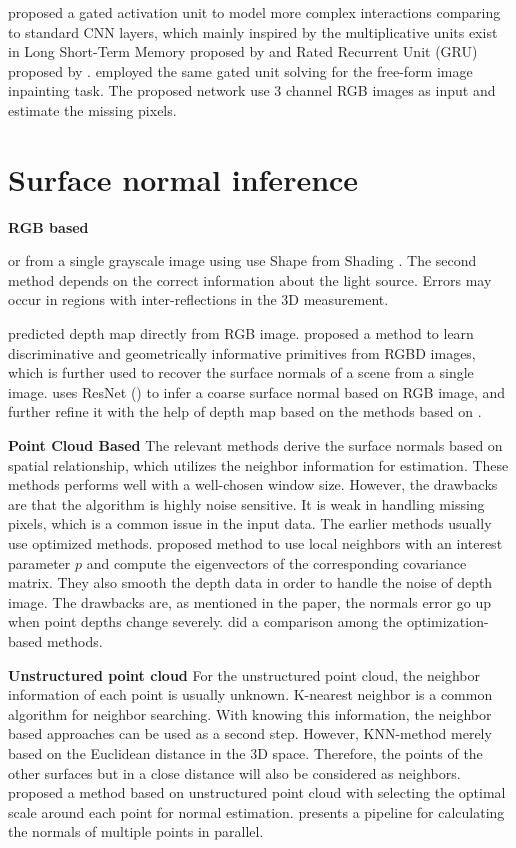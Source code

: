 \cite{gated_activation} proposed a gated activation unit to model more complex interactions comparing to standard CNN layers, which mainly inspired by the multiplicative units exist in Long Short-Term Memory proposed by \cite{lstm} and Rated Recurrent Unit (GRU) proposed by \cite{gru}. 
\cite{gconv} employed the same gated unit solving for the free-form image inpainting task. The proposed network use 3 channel RGB images as input and estimate the missing pixels. 




\section{Surface normal inference}
\textbf{RGB based}  

or from a single grayscale image using use Shape from Shading \cite{SFS}.  The second method depends on the correct information about the light source. Errors may occur in regions with inter-reflections in the 3D measurement. 


\cite{Eigen} predicted depth map directly from RGB image. 
\cite{geometry_based_solution} proposed a method to learn discriminative and geometrically informative primitives from RGBD images, which is further used to recover the surface normals of a scene from a single image. 
\cite{GeoNet} uses ResNet (\cite{resnet}) to infer a coarse surface normal based on RGB image, and further refine it with the help of depth map based on the methods based on \cite{geometry_based_solution}.


\textbf{Point Cloud Based} 
The relevant methods derive the surface normals based on spatial relationship, which utilizes the neighbor information for estimation. These methods performs well with a well-chosen window size. However, the drawbacks are that the algorithm is highly noise sensitive. It is weak in handling missing pixels, which is a common issue in the input data. The earlier methods usually use optimized methods. \cite{Holzer.S} proposed method to use local neighbors with an interest parameter $ p $ and compute the eigenvectors of the corresponding covariance matrix. They also smooth the depth data in order to handle the noise of depth image. The drawbacks are, as mentioned in the paper, the normals error go up when point depths change severely.  \cite{optimized-methods} did a comparison among the optimization-based methods. 

\textbf{Unstructured point cloud}
For the unstructured point cloud, the neighbor information of each point is usually unknown. K-nearest neighbor is a common algorithm for neighbor searching. With knowing this information, the neighbor based approaches can be used as a second step. However, KNN-method merely based on the Euclidean distance in the 3D space. Therefore, the points of the other surfaces but in a close distance will also be considered as neighbors. \cite{unstructed-pc} proposed a method based on unstructured point cloud with selecting the optimal scale around each point for normal estimation. \cite{unstructed-pc-patch-stitching} presents a pipeline for calculating the normals of multiple points in parallel. 

